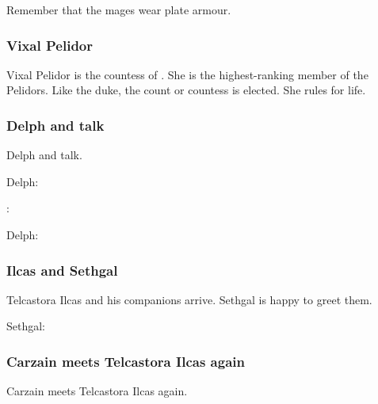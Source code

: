 \begin{garbage}
Remember that the \ishrah{} mages wear plate armour. 





\subsubsection{Vixal Pelidor}
Vixal Pelidor is the countess of \Forklin. 
She is the highest-ranking member of the \Forkliner{} Pelidors. 
Like the duke, the count or countess is elected. 
She rules for life. 





\subsubsection{Delph and \Tsekkect{} talk}
Delph and \Tsekkect{} talk. 

\begin{prose}
  Delph: 
  
  \Tsekkect: 
  
  Delph: 
\end{prose}





\subsubsection{Ilcas and Sethgal}
Telcastora Ilcas and his companions arrive. 
Sethgal is happy to greet them. 

\begin{prose}
  Sethgal: 
  
\end{prose}





\subsubsection{Carzain meets Telcastora Ilcas again}
Carzain meets Telcastora Ilcas again. 


\end{garbage}
